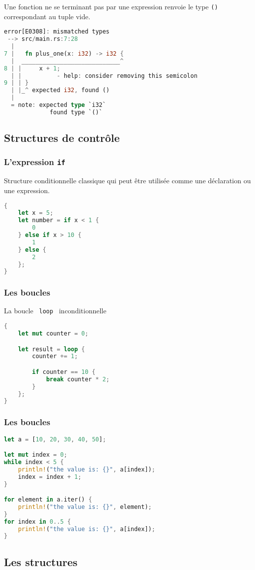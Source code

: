 \begin{frame}[fragile]
  Une fonction ne se terminant pas par une expression renvoie le type \texttt{()} correspondant au tuple vide.
  \begin{lstlisting}[language=rust]
error[E0308]: mismatched types
 --> src/main.rs:7:28
  |
7 |   fn plus_one(x: i32) -> i32 {
  |  ____________________________^
8 | |     x + 1;
  | |          - help: consider removing this semicolon
9 | | }
  | |_^ expected i32, found ()
  |
  = note: expected type `i32`
             found type `()`
  \end{lstlisting}
\end{frame}

\subsection{Structures de contrôle}
\begin{frame}[fragile]
  \frametitle{L'expression \texttt{if}}
Structure conditionnelle classique qui peut être utilisée comme une déclaration ou une expression.
\begin{lstlisting}[language=rust]
{
    let x = 5;
    let number = if x < 1 {
        0
    } else if x > 10 {
        1
    } else {
        2
    };
}
\end{lstlisting}  
\end{frame}
\begin{frame}[fragile]
  \frametitle{Les boucles}
La boucle \texttt{ loop } inconditionnelle
  \begin{lstlisting}[language=rust]
{
    let mut counter = 0;

    let result = loop {
        counter += 1;

        if counter == 10 {
            break counter * 2;
        }
    };
}
  \end{lstlisting}
\end{frame}
\begin{frame}[fragile]
  \frametitle{Les boucles}
  \begin{lstlisting}[language=rust]
let a = [10, 20, 30, 40, 50];

let mut index = 0;
while index < 5 {
    println!("the value is: {}", a[index]);
    index = index + 1;
}

for element in a.iter() {
    println!("the value is: {}", element);
}
for index in 0..5 {
    println!("the value is: {}", a[index]);
}
  \end{lstlisting}
\end{frame}
\subsection{Les structures}

